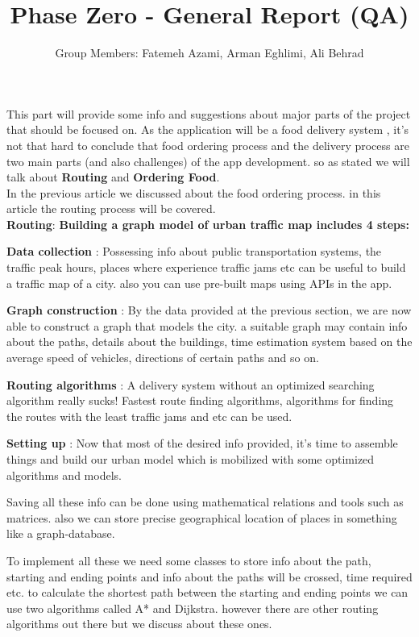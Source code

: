 \documentclass[12pt]{article}
\title{Phase Zero - General Report (QA)}
\author{Group Members: Fatemeh Azami, Arman Eghlimi, Ali Behrad}
\begin{document}
\maketitle

This part will provide some info and suggestions about major parts of the project that should be focused on. As the application will be a food delivery system , it's not that hard to conclude that food ordering process and the delivery process are two main parts (and also challenges) of the app development.
so as stated we will talk about \textbf{Routing} and \textbf{Ordering Food}. \\

In the previous article we discussed about the food ordering process. in this article the routing process will be covered. \\

\textbf{Routing}: \textbf{Building a graph model of urban traffic map includes 4 steps:}

\textbf{Data collection} : Possessing info about public transportation systems, the traffic peak hours, places where experience traffic jams etc can be useful to build a traffic map of a city. 
also you can use pre-built maps using APIs in the app.

\textbf{Graph construction} : By the data provided at the previous section, we are now able to construct a graph that models the city. a suitable graph may contain info about the paths, details about the buildings, 
time estimation system based on the average speed of vehicles, directions of certain paths and so on.

\textbf{Routing algorithms} : A delivery system without an optimized searching algorithm really sucks! Fastest route finding algorithms, algorithms for finding the routes with the least traffic jams and etc can be used.

\textbf{Setting up} : Now that most of the desired info provided, it's time to assemble things and build our urban model which is mobilized with some optimized algorithms and models.

Saving all these info can be done using mathematical relations and tools such as matrices. also we can store precise geographical location of places in something like a graph-database.

To implement all these we need some classes to store info about the path, starting and ending points and info about the paths will be crossed, time required etc. 
to calculate the shortest path between the starting and ending points we can use two algorithms called A* and Dijkstra. however there are other routing algorithms out there but we discuss about these ones. \\
\end{document}
